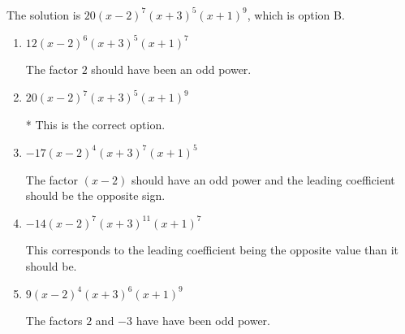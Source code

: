 \documentclass{extbook}[14pt]
\begin{document}
\begin{enumerate}
{The solution is \( 20(x - 2)^{7} (x + 3)^{5} (x + 1)^{9} \), which is option B.\begin{enumerate}[label=\Alph*.]
\item \( 12(x - 2)^{6} (x + 3)^{5} (x + 1)^{7} \)

The factor $2$ should have been an odd power.
\item \( 20(x - 2)^{7} (x + 3)^{5} (x + 1)^{9} \)

* This is the correct option.
\item \( -17(x - 2)^{4} (x + 3)^{7} (x + 1)^{5} \)

The factor $(x - 2)$ should have an odd power and the leading coefficient should be the opposite sign.
\item \( -14(x - 2)^{7} (x + 3)^{11} (x + 1)^{7} \)

This corresponds to the leading coefficient being the opposite value than it should be.
\item \( 9(x - 2)^{4} (x + 3)^{6} (x + 1)^{9} \)

The factors $2$ and $-3$ have have been odd power.
\end{enumerate}

}
\end{enumerate}
\end{document}
